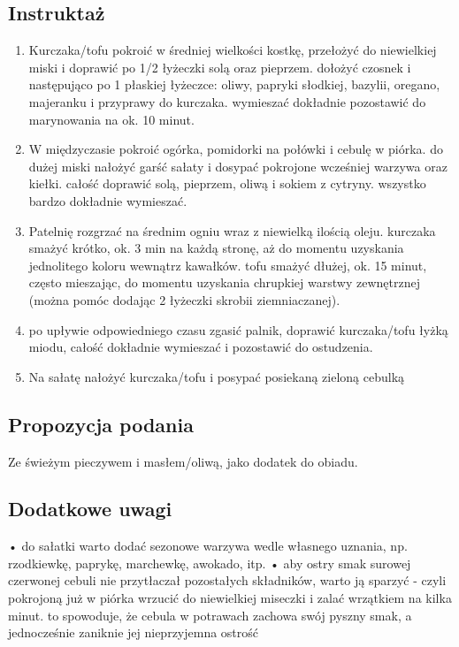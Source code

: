 \documentclass[a4paper,10pt]{book}
\begin{document}
\subsection*{Instruktaż}
\begin{enumerate}
    \item Kurczaka/tofu pokroić w średniej wielkości kostkę, przełożyć do niewielkiej miski i doprawić po 1/2 łyżeczki solą oraz pieprzem. dołożyć czosnek i następująco po 1 płaskiej łyżeczce: oliwy, papryki słodkiej, bazylii, oregano, majeranku i przyprawy do kurczaka. wymieszać dokładnie pozostawić do marynowania na ok. 10 minut. 
    \item W międzyczasie pokroić ogórka, pomidorki na połówki i cebulę w piórka. do dużej miski nałożyć garść sałaty i dosypać pokrojone wcześniej warzywa oraz kiełki. całość doprawić solą, pieprzem, oliwą i sokiem z cytryny. wszystko bardzo dokładnie wymieszać.
    \item Patelnię rozgrzać na średnim ogniu wraz z niewielką ilością oleju. kurczaka smażyć krótko, ok. 3 min na każdą stronę, aż do momentu uzyskania jednolitego koloru wewnątrz kawałków. tofu smażyć dłużej, ok. 15 minut, często mieszając, do momentu uzyskania chrupkiej warstwy zewnętrznej (można pomóc dodając 2 łyżeczki skrobii ziemniaczanej). 
    \item po upływie odpowiedniego czasu zgasić palnik, doprawić kurczaka/tofu łyżką miodu, całość dokładnie wymieszać i pozostawić do ostudzenia.
    \item Na sałatę nałożyć kurczaka/tofu i posypać posiekaną zieloną cebulką
\end{enumerate}

\vspace{0.5cm} 

\small
\subsection*{Propozycja podania}
Ze świeżym pieczywem i masłem/oliwą, jako dodatek do obiadu.

\vspace{0.3cm}

\subsection*{Dodatkowe uwagi}
• do sałatki warto dodać sezonowe warzywa wedle własnego uznania, np. rzodkiewkę, paprykę, marchewkę, awokado, itp. 
 • aby ostry smak surowej czerwonej cebuli nie przytłaczał pozostałych składników, warto ją sparzyć - czyli pokrojoną już w piórka wrzucić do niewielkiej miseczki i zalać wrzątkiem na kilka minut. to spowoduje, że cebula w potrawach zachowa swój pyszny smak, a jednocześnie zaniknie jej nieprzyjemna ostrość
\end{document}

